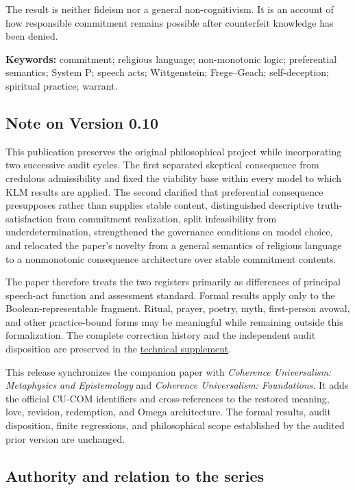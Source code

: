 \documentclass[
  11pt,
]{article}
\begin{document}
The result is neither fideism nor a general non-cognitivism. It is an
account of how responsible commitment remains possible after counterfeit
knowledge has been denied.

\textbf{Keywords:} commitment; religious language; non-monotonic logic;
preferential semantics; System P; speech acts; Wittgenstein;
Frege--Geach; self-deception; spiritual practice; warrant.

\subsection{Note on Version 0.10}\label{note-on-version-0.10}

This publication preserves the original philosophical project while
incorporating two successive audit cycles. The first separated skeptical
consequence from credulous admissibility and fixed the viability base
within every model to which KLM results are applied. The second
clarified that preferential consequence presupposes rather than supplies
stable content, distinguished descriptive truth-satisfaction from
commitment realization, split infeasibility from underdetermination,
strengthened the governance conditions on model choice, and relocated
the paper's novelty from a general semantics of religious language to a
nonmonotonic consequence architecture over stable commitment contents.

The paper therefore treats the two registers primarily as differences of
principal speech-act function and assessment standard. Formal results
apply only to the Boolean-representable fragment. Ritual, prayer,
poetry, myth, first-person avowal, and other practice-bound forms may be
meaningful while remaining outside this formalization. The complete
correction history and the independent audit disposition are preserved
in the
\href{../supplements/10_Denying_Knowledge_Technical_Supplement_v0.10.md}{technical
supplement}.

This release synchronizes the companion paper with \emph{Coherence
Universalism: Metaphysics and Epistemology} and \emph{Coherence
Universalism: Foundations}. It adds the official CU-COM identifiers and
cross-references to the restored meaning, love, revision, redemption,
and Omega architecture. The formal results, audit disposition, finite
regressions, and philosophical scope established by the audited prior
version are unchanged.

\subsection{Authority and relation to the
series}\label{authority-and-relation-to-the-series}
\end{document}
